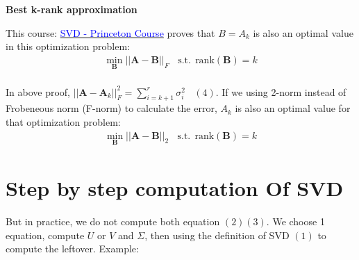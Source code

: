 \documentclass[a4paper, 12pt]{report}
\begin{document}
\textbf{\Large Best k-rank approximation}

\indent \par This course: \href{https://www.cs.princeton.edu/courses/archive/spring12/cos598C/svdchapter.pdf}{\textcolor{blue}{SVD - Princeton Course}} proves that $B = A_k$ is also an optimal value in this optimization problem: 
\begin{eqnarray*}
\min_{\mathbf{B}} ||\mathbf{A} - \mathbf{B}||_F \ ~~~
\text{s.t.} ~~ \text{rank}(\mathbf{B}) = k 
\end{eqnarray*}\\
In above proof, $||\mathbf{A} - \mathbf{A}_k||_F^2 = \sum_{i = k + 1}^r \sigma_i^2 ~~~~ (4)$. If we using 2-norm instead of Frobeneous norm (F-norm) to calculate the error, $A_k$ is also an optimal value for that optimization problem:
\begin{eqnarray*}
\min_{\mathbf{B}} ||\mathbf{A} - \mathbf{B}||_2 \  ~~~
\text{s.t.} ~~ \text{rank}(\mathbf{B}) = k
\end{eqnarray*}
\section{ Step by step computation Of SVD}
\indent \par But in practice, we do not compute both equation $(2)(3)$. We choose 1 equation, compute $U$ or $V$ and $\Sigma$, then using the definition of SVD $(1)$ to compute the leftover.
Example:
\end{document}
